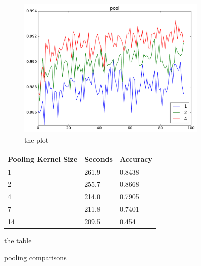 \documentclass{article}
\begin{document}
\begin{enumerate}
\begin{item}
		\begin{figure}[h]
			\centering	
			\begin{subfigure}[b]{0.45\textwidth}
				\includegraphics[width=\textwidth]{figures/pool}
				\caption{the plot}
				\label{fig:pooling_cpu}
			\end{subfigure}	
			\quad
			\begin{subtable}[b]{0.4\textwidth}
				\begin{tabular}{lll}
					\toprule
					Pooling Kernel Size     & Seconds & Accuracy \\
					\midrule
					1 & 261.9 & 0.8438 \\
					2 & 255.7 & 0.8668 \\
					4 & 214.0 & 0.7905 \\
					7 & 211.8 & 0.7401 \\
					14 & 209.5 & 0.454 \\
					\bottomrule
				\end{tabular}
				\caption{the table}
				\label{pooling_comp_table}
			\end{subtable}	
			\caption{pooling comparisons}
			\label{pooling_comparisons}
		\end{figure}
	\end{item}

	
\end{enumerate}
\end{document}
